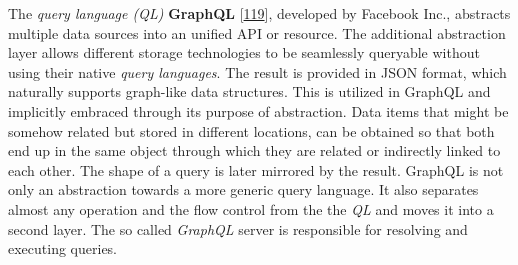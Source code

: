 \documentclass[12pt,english,a4paper,titlepage,cleardoublepage=empty,dottedtoc]{report}
\begin{document}
The \emph{query language (QL)}
\textbf{\protect\hypertarget{def--graphql}{}{GraphQL}}
{[}\protect\hyperlink{ref-web_spec_graphql}{119}{]}, developed by
Facebook Inc., abstracts multiple data sources into an unified API or
resource. The additional abstraction layer allows different storage
technologies to be seamlessly queryable without using their native
\emph{query languages}. The result is provided in JSON format, which
naturally supports graph-like data structures. This is utilized in
GraphQL and implicitly embraced through its purpose of abstraction. Data
items that might be somehow related but stored in different locations,
can be obtained so that both end up in the same object through which
they are related or indirectly linked to each other. The shape of a
query is later mirrored by the result. GraphQL is not only an
abstraction towards a more generic query language. It also separates
almost any operation and the flow control from the the \emph{QL} and
moves it into a second layer. The so called \emph{GraphQL} server is
responsible for resolving and executing queries.
\end{document}
